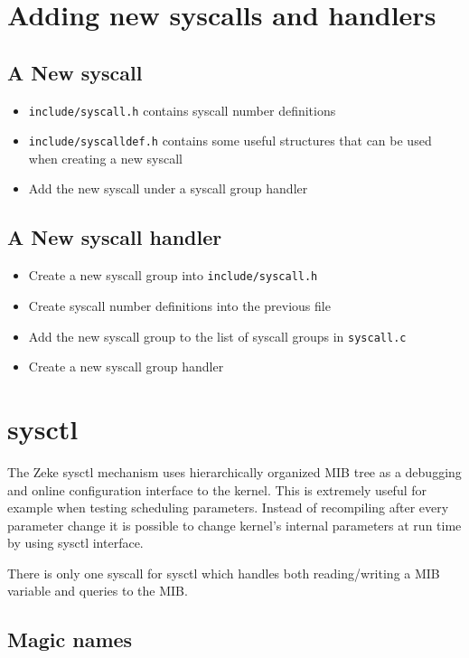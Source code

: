 \chapter{Adding new syscalls and handlers}

\section{A New syscall}

\begin{itemize}
\item \verb+include/syscall.h+ contains syscall number definitions
\item \verb+include/syscalldef.h+ contains some useful structures that can be used when
      creating a new syscall
\item Add the new syscall under a syscall group handler
\end{itemize}

\section{A New syscall handler}

\begin{itemize}
\item Create a new syscall group into \verb+include/syscall.h+
\item Create syscall number definitions into the previous file
\item Add the new syscall group to the list of syscall groups in \verb+syscall.c+
\item Create a new syscall group handler
\end{itemize}


\chapter{sysctl}

The Zeke sysctl mechanism uses hierarchically organized \ac{MIB} tree as a
debugging and online configuration interface to the kernel. This is extremely
useful for example when testing scheduling parameters. Instead of recompiling
after every parameter change it is possible to change kernel's internal
parameters at run time by using sysctl interface.

There is only one syscall for sysctl which handles both reading/writing a
\ac{MIB} variable and queries to the MIB.

\section{Magic names}

